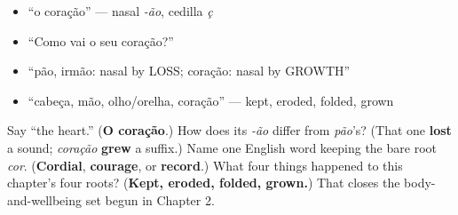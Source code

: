 \begin{itemize}
\raggedright
  \item \textquotedblleft{}o coração\textquotedblright{} — nasal \emph{-ão}, cedilla \emph{ç}
  \item \textquotedblleft{}Como vai o seu coração?\textquotedblright{}
  \item \textquotedblleft{}pão, irmão: nasal by LOSS; coração: nasal by GROWTH\textquotedblright{}
  \item \textquotedblleft{}cabeça, mão, olho/orelha, coração\textquotedblright{} — kept, eroded, folded, grown
\end{itemize}

\begin{tcolorbox}[breakable,colback=teal!4,colframe=teal!35!black,title={Before you move on}]
Say \textquotedblleft{}the heart.\textquotedblright{} (\textbf{O coração}.) How does its \emph{-ão} differ from \emph{pão}'s? (That one \textbf{lost} a sound; \emph{coração} \textbf{grew} a suffix.) Name one English word keeping the bare root \emph{cor}. (\textbf{Cordial}, \textbf{courage}, or \textbf{record}.) What four things happened to this chapter's four roots? (\textbf{Kept, eroded, folded, grown.}) That closes the body-and-wellbeing set begun in Chapter 2.
\end{tcolorbox}
